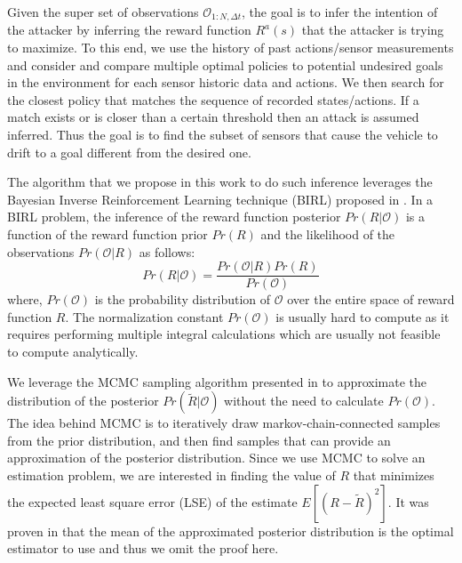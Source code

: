 \documentclass[letterpaper, 10 pt, conference]{ieeeconf}  %
\begin{document}
Given the super set of observations $\mathcal{\mathcal{O}}_{1:N,\Delta t}$, the goal is to infer the intention of the attacker by inferring the reward function $R^a (s)$ that the attacker is trying to maximize. To this end, we use the history of past actions/sensor measurements and consider and compare multiple optimal policies to potential undesired goals in the environment for each sensor historic data and actions. We then search for the closest policy that matches the sequence of recorded states/actions. If a match exists or is closer than a certain threshold then an attack is assumed inferred. Thus the goal is to find the subset of sensors that cause the vehicle to drift to a goal different from the desired one.




The algorithm that we propose in this work to do such inference leverages the Bayesian Inverse Reinforcement Learning technique (BIRL) proposed in \cite{ramachandran2007bayesian}. In a BIRL problem, the inference of the reward function posterior $Pr(R|\mathcal{O})$ is a function of the reward function prior $Pr(R)$ and the likelihood of the observations $Pr(\mathcal{O}|R)$ as follows:
\begin{equation} 
    Pr(R|\mathcal{O}) = \frac{Pr(\mathcal{O}|R)Pr(R)}{Pr(\mathcal{O})}
\end{equation}
where, $Pr(\mathcal{O})$ is the probability distribution of $\mathcal{O}$ over the entire space of reward function $R$. The normalization constant $Pr(\mathcal{O})$ is usually hard to compute as it requires performing multiple integral calculations which are usually not feasible to compute analytically. 

We leverage the MCMC sampling algorithm presented in \cite{andrieu2003introduction} to approximate the distribution of the posterior $Pr(\tilde{R}|\mathcal{O})$ without the need to calculate $Pr(\mathcal{O})$. The idea behind MCMC is to iteratively draw markov-chain-connected samples from the prior distribution, and then find samples that can provide an approximation of the posterior distribution. Since we use MCMC to solve an estimation problem, we are interested in finding the value of $R$ that minimizes the expected least square error (LSE) of the estimate $E[(R-\tilde{R})^2]$. It was proven in \cite{ramachandran2007bayesian} that the mean of the approximated posterior distribution is the optimal estimator to use and thus we omit the proof here.
\end{document}
